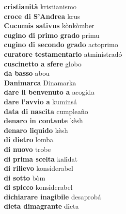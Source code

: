 \textbf{ cristianità  } kristianismo \\
\textbf{ croce di S’Andrea  } krus \\
\textbf{ Cucumis sativus  } kònkòmber \\
\textbf{ cugino di primo grado  } primu \\
\textbf{ cugino di secondo grado  } actoprimo \\
\textbf{ curatore testamentario  } atministradó \\
\textbf{ cuscinetto a sfere  } globo \\
\textbf{ da basso  } abou \\
\textbf{ Danimarca  } Dinamarka \\
\textbf{ dare il benvenuto a  } acogida \\
\textbf{ dare l’avvio a  } kuminsá \\
\textbf{ data di nascita  } cumpleaño \\
\textbf{ denaro in contante  } kèsh \\
\textbf{ denaro liquido  } kèsh \\
\textbf{ di dietro  } lomba \\
\textbf{ di nuovo  } trobe \\
\textbf{ di prima scelta  } kalidat \\
\textbf{ di rilievo  } konsiderabel \\
\textbf{ di sotto  } bòm \\
\textbf{ di spicco  } konsiderabel \\
\textbf{ dichiarare inagibile  } desaprobá \\
\textbf{ dieta dimagrante  } dieta \\
